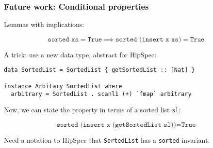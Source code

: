 \documentclass[serif,professionalfont]{beamer}
\newcommand\hs[1]{\texttt{#1}}
\begin{document}
\begin{frame}[fragile]
  \frametitle{Future work: Conditional properties}

  Lemmas with implications:

  \begin{equation*}
    \hs{sorted xs} = \hs{True} \implies \hs{sorted (insert x xs)} = \hs{True}
  \end{equation*}

  \pause
  {\color{Purpleee} A trick:} use a new data type, abstract for HipSpec:

  \begin{verbatim}
data SortedList = SortedList { getSortedList :: [Nat] }

instance Arbitary SortedList where
  arbitrary = SortedList . scanl1 (+) `fmap` arbitrary
  \end{verbatim}

  \vspace{-\baselineskip}

  \pause
  Now, we can state the property in terms of a sorted list \hs{sl}:

  \begin{equation*}
    \hs{sorted (insert x (getSortedList sl))} = \hs{True}
  \end{equation*}

  Need a notation to HipSpec that \hs{SortedList} has
  a \hs{sorted} invariant.


\end{frame}



%
%
%
%
%
%
\end{document}

